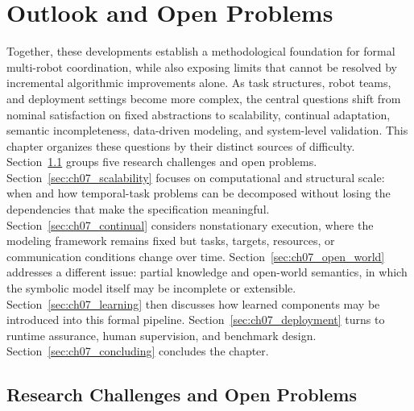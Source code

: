 \chapter{Outlook and Open Problems}
\label{chap:outlook}

 Together,
these developments establish a methodological foundation for formal
multi-robot coordination, while also exposing limits that cannot be resolved
by incremental algorithmic improvements alone. As task structures, robot teams,
and deployment settings become more complex, the central questions shift from
nominal satisfaction on fixed abstractions to scalability, continual adaptation, semantic
incompleteness, data-driven modeling, and system-level validation.
This chapter organizes these questions by their distinct sources of
difficulty. Section~\ref{sec:ch07_research_challenges} groups five research
challenges and open problems. Section~\ref{sec:ch07_scalability} focuses on
computational and structural scale: when and how temporal-task problems can be
decomposed without losing the dependencies that make the specification
meaningful. Section~\ref{sec:ch07_continual} considers nonstationary
execution, where the modeling framework remains fixed but tasks, targets,
resources, or communication conditions change over time.
Section~\ref{sec:ch07_open_world} addresses a different issue: partial
knowledge and open-world semantics, in which the symbolic model itself may be
incomplete or extensible. Section~\ref{sec:ch07_learning} then discusses
how learned components may be introduced into this formal pipeline.
Section~\ref{sec:ch07_deployment} turns to runtime assurance, human
supervision, and benchmark design. Section~\ref{sec:ch07_concluding}
concludes the chapter.

\section{Research Challenges and Open Problems}
\label{sec:ch07_research_challenges}

